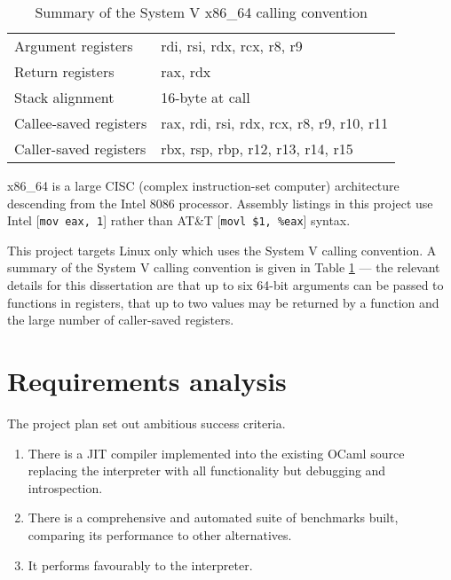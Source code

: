 \begin{table}[h]
    \centering

    \begin{tabular}{ll}\toprule
        Argument registers     & rdi, rsi, rdx, rcx, r8, r9                \\
        Return registers       & rax, rdx                                  \\
        Stack alignment        & 16-byte at call                           \\
        Callee-saved registers & rax, rdi, rsi, rdx, rcx, r8, r9, r10, r11 \\
        Caller-saved registers & rbx, rsp, rbp, r12, r13, r14, r15         \\
        \bottomrule
    \end{tabular}

    \caption{Summary of the System V x86\_64 calling convention}
    \label{table:systemv}

\end{table}

x86\_64 is a large CISC (complex instruction-set computer) architecture descending from the Intel
8086 processor.
Assembly listings in this project use Intel
    [\texttt{mov eax, 1}] rather than AT\&T [\texttt{movl
    \$1, \%eax}] syntax.

This project targets Linux only which uses the System V calling convention.  A summary of the
System V calling convention is given in Table \ref{table:systemv} --- the relevant details for this
dissertation are that up to six 64-bit arguments can be passed to functions in registers, that up
to two values may be returned by a function and the large number of caller-saved registers.

\section{Requirements analysis}

The project plan set out ambitious success criteria.

\begin{enumerate}
    \item There is a JIT compiler implemented into the existing OCaml source
          replacing the interpreter with all functionality but debugging
          and introspection.
    \item There is a comprehensive and automated suite of benchmarks built,
          comparing its performance to other alternatives.
    \item It performs favourably to the interpreter.
\end{enumerate}

